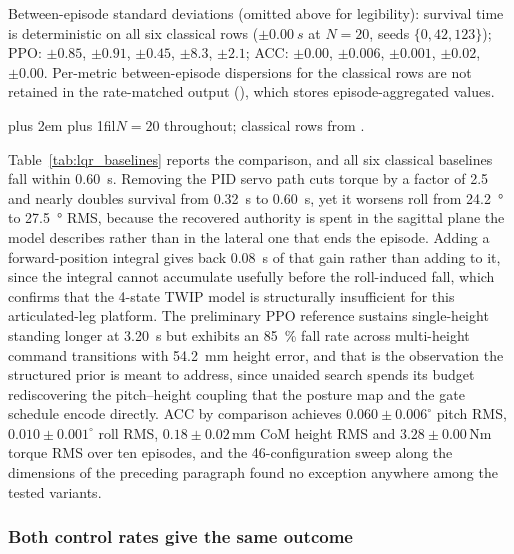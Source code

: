 \documentclass[a4paper,fleqn]{cas-dc}
\newcommand{\tabnote}{\par\leftskip=0pt\rightskip=0pt plus 2em%
  \parfillskip=0pt plus 1fil\relax}
\begin{document}
\begin{table}[pos=!tbp]
Between-episode standard deviations (omitted above for legibility): survival time is
deterministic on all six classical rows ($\pm\SI{0.00}{s}$ at $N{=}20$, seeds $\{0,42,123\}$);
PPO: $\pm0.85$, $\pm0.91$, $\pm0.45$, $\pm8.3$, $\pm2.1$;
ACC: $\pm0.00$, $\pm0.006$, $\pm0.001$, $\pm0.02$, $\pm0.00$.
Per-metric between-episode dispersions for the classical rows are not retained in the
rate-matched output (), which stores
episode-aggregated values.
\vspace{2pt}\tabnote\noindent $N{=}20$ throughout; classical rows from .
\end{table}

Table~\ref{tab:lqr_baselines} reports the comparison, and all six classical
baselines fall within \SI{0.60}{s}. Removing the PID servo path cuts torque by a
factor of \num{2.5} and nearly doubles survival from \SI{0.32}{s} to
\SI{0.60}{s}, yet it worsens roll from \SI{24.2}{\degree} to \SI{27.5}{\degree}
RMS, because the recovered authority is spent in the sagittal plane the model
describes rather than in the lateral one that ends the episode. Adding a
forward-position integral gives back \SI{0.08}{s} of that gain rather than adding
to it, since the integral cannot accumulate usefully before the roll-induced
fall, which confirms that the 4-state TWIP model is structurally insufficient for
this articulated-leg platform. The preliminary PPO reference sustains
single-height standing longer at \SI{3.20}{s} but exhibits an \SI{85}{\percent}
fall rate across multi-height command transitions with \SI{54.2}{mm} height
error, and that is the observation the structured prior is meant to address,
since unaided search spends its budget rediscovering the pitch--height coupling
that the posture map and the gate schedule encode directly. ACC by comparison achieves $0.060{\pm}0.006^\circ$ pitch RMS,
$0.010{\pm}0.001^\circ$ roll RMS, $0.18{\pm}0.02$\,mm CoM height RMS and
$3.28{\pm}0.00$\,Nm torque RMS over ten episodes, and the
\num{46}-configuration sweep along the dimensions of the preceding paragraph
found no exception anywhere among the tested variants.

\subsubsection{Both control rates give the same outcome}
\label{sec:rate_matched}
\end{document}
